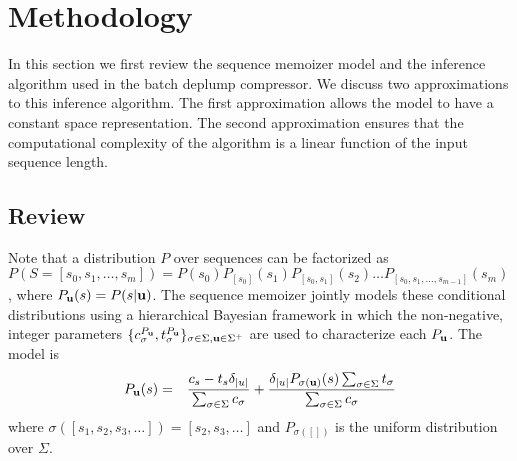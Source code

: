 \section{Methodology}
\label{section:methodology}
\newcommand{\PY}{\ensuremath{\mathcal{P}\mathcal{Y}}}

In this section we first review the sequence memoizer model and the inference algorithm used in the batch deplump compressor. We discuss two approximations to this inference algorithm.  The first approximation allows the model to have a constant space representation.  The second approximation ensures that the computational complexity of the algorithm is a linear function of the input sequence length.

\subsection{Review}

Note that a distribution $P$ over sequences can be factorized as $P(S = [s_0, s_1, \ldots, s_m]) = P(s_0)P_{[s_0]}(s_1)P_{[s_0,s_1]}(s_2) \ldots P_{[s_0,s_1,\ldots,s_{m-1}]}(s_m)$, where $P_{\bf u}(s) = P(s | {\bf u})$.  The sequence memoizer \citep{Wood2009} jointly models these conditional distributions using a hierarchical Bayesian framework in which the non-negative, integer parameters $\{ c^{P_{\bf u}}_\sigma, t^{P_{\bf u}}_\sigma \}_{\sigma \in \Sigma, {\bf u} \in \Sigma^{+}}$ are used to characterize each $P_{\bf u }$.  The model is
%
\begin{eqnarray*}
	P_{\bf u}(s) &=& \frac{c_s - t_s \delta_{|u|} }{\sum_{\sigma \in \Sigma} c_\sigma} +  \frac{\delta_{|u|} P_{ \sigma({\bf u})}(s) \sum_{\sigma \in \Sigma} t_\sigma}{\sum_{\sigma \in \Sigma} c_\sigma} \\
\end{eqnarray*}
%
\noindent where $\sigma([s_1, s_2, s_3, \ldots]) = [s_2,s_3, \ldots]$ and $P_{\sigma([])}$ is the uniform distribution over $\Sigma$.

